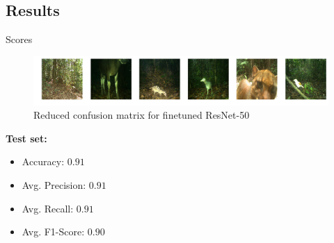 \documentclass[10pt]{beamer}
\begin{document}
\subsection{Results}

\begin{frame}{Scores}
	\centering
	\begin{minipage}[r]{0.58\linewidth}
		\begin{figure}
			\hfill
			\hspace*{.5cm}\includegraphics[width=.8\columnwidth]{images/images_below.png}
			\caption{Reduced confusion matrix for finetuned ResNet-50}
		\end{figure}
	\end{minipage}
	\begin{minipage}[c]{0.38\linewidth}
		\textbf{Test set:}
		\begin{itemize}
			\item Accuracy: $0.91$
			\item Avg. Precision: $0.91$      
			\item Avg. Recall: $0.91$
			\item Avg. F1-Score: $0.90$
		\end{itemize}
	\end{minipage}
\end{frame}
\end{document}
